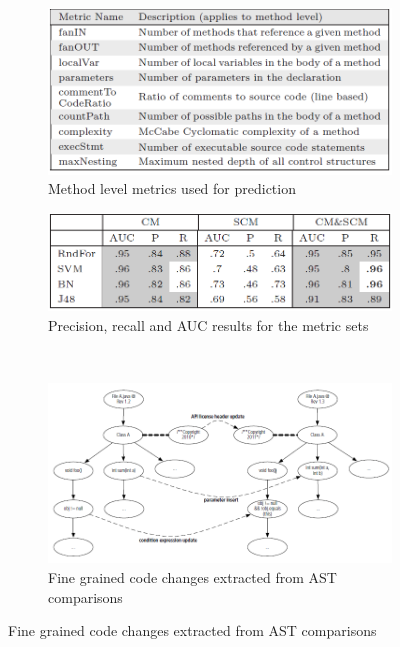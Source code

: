 \documentclass{article}
\begin{document}
 \begin{figure}[H]
     \begin{subfigure}{.5\textwidth}
         \centering
         \includegraphics[scale=0.3]{./src/method_prediction_metrics.png}
         \caption{Method level metrics used for prediction}\label{method_prediction:metrics}
     \end{subfigure}%
     \begin{subfigure}{.5\textwidth}
         \centering
         \includegraphics[scale=0.4]{./src/method_prediction_results.png}
         \caption{Precision, recall and AUC results for the metric sets}\label{method_prediction:results}
     \end{subfigure}\\
     \begin{subfigure}{\textwidth}
         \centering
         \includegraphics[scale=0.4]{./src/method_prediction_ast.png}
         \caption{Fine grained code changes extracted from AST comparisons}\label{method_prediction:ast}
     \end{subfigure}  
 \end{figure}
\end{document}
